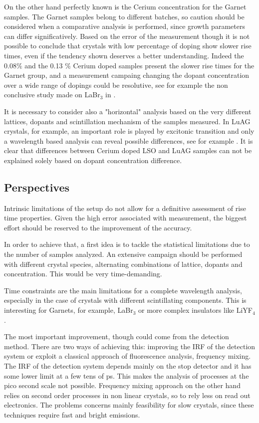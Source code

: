 On the other hand perfectly known is the Cerium concentration for the Garnet samples. 
The Garnet samples belong to different batches, so caution should be considered when a comparative analysis is performed, since growth parameters can differ significatively. Based on the error of the measurement though it is not possible to conclude that crystals with low percentage of doping show slower rise times, even if the tendency shown deserves a better understanding. Indeed the 0.08$\%$ and the 0.13 $\%$ Cerium doped samples present the slower rise times for the Garnet group, and a measurement campaing changing the dopant concentration over a wide range of dopings could be resolutive, see for example the non conclusive study made on LaBr$_{3}$ in \cite{Moses2004}.

It is necessary to consider also a "horizontal" analysis based on the very different lattices, dopants and scintillation mechanism of the samples measured. In LuAG crystals, for example, an important role is played by excitonic transition and only a wavelength based analysis can reveal possible differences, see for example \cite{Belsky2013}.
It is clear that differences between Cerium doped LSO and LuAG samples can not be explained solely based on dopant concentration difference.

\subsection{Perspectives}
Intrinsic limitations of the setup do not allow for a definitive assessment of rise time properties. Given the high error associated with measurement, the biggest effort should be reserved to the improvement of the accuracy.

In order to achieve that, a first idea is to tackle the statistical limitations due to the number of samples analyzed. An extensive campaign should be performed with different crystal species, alternating combinations of lattice, dopants and concentration. This would be very time-demanding.

Time constraints are the main limitations for a complete wavelength analysis, especially in the case of crystals with different scintillating components. This is interesting for Garnets, for example, LaBr$_{3}$ or more complex insulators like LiYF$_{4}$.

The most important improvement, though could come from the detection method. There are two ways of achieving this: improving the IRF of the detection system or exploit a classical approach of fluorescence analysis, frequency mixing. The IRF of the detection system depends mainly on the stop detector and it has some lower limit at a few tens of ps. This makes the analysis of processes at the pico second scale not possible.
Frequency mixing approach on the other hand relies on second order processes in non linear crystals, so to rely less on read out electronics. The problems concerns mainly feasibility for slow crystals, since these techniques require fast and bright emissions.
